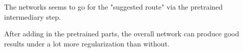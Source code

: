 The networks seems to go for the "suggested route" via the pretrained intermediary step.

After adding in the pretrained parts, the overall network can produce good results under a lot more regularization than without.